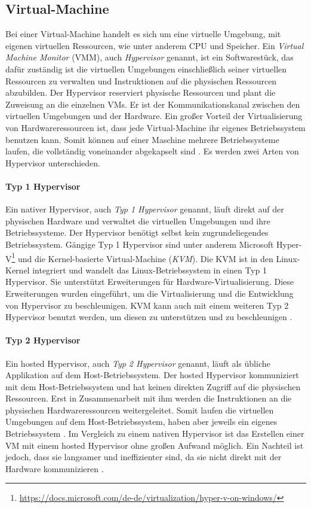 \subsection{Virtual-Machine}
Bei einer Virtual-Machine handelt es sich um eine virtuelle Umgebung, mit 
eigenen virtuellen Ressourcen, wie unter anderem CPU und Speicher.
Ein \emph{Virtual Machine Monitor} (VMM), auch \emph{Hypervisor} genannt, 
ist ein Softwarestück, das dafür zuständig ist die 
virtuellen Umgebungen einschließlich seiner virtuellen Ressourcen zu verwalten
und Instruktionen auf die physischen Ressourcen abzubilden.
Der Hypervisor reserviert physische Ressourcen und plant die Zuweisung
an die einzelnen VMs. Er ist der Kommunikationskanal 
zwischen den virtuellen Umgebungen und der Hardware.
Ein großer Vorteil der Virtualisierung von Hardwareressourcen
ist, dass jede Virtual-Machine ihr eigenes Betriebssystem
benutzen kann. Somit können auf einer Maschine
mehrere Betriebssysteme laufen, die vollständig voneinander abgekapselt sind
\cite{RedHatVM} \cite{RedHatHypervisor}. Es werden zwei
Arten von Hypervisor unterschieden.

\paragraph{Typ 1 Hypervisor} Ein nativer Hypervisor, auch
\emph{Typ 1 Hypervisor} genannt, läuft direkt auf der physischen
Hardware und verwaltet die virtuellen Umgebungen und ihre Betriebssysteme.
Der Hypervisor benötigt selbst kein zugrundeliegendes Betriebssystem.
Gängige Typ 1 Hypervisor sind unter anderem Microsoft Hyper-V\footnote{\url{https://docs.microsoft.com/de-de/virtualization/hyper-v-on-windows/}}
und die Kernel-basierte Virtual-Machine (\emph{KVM}). Die KVM \cite{RedHatKVM} ist in den Linux-Kernel integriert und wandelt
das Linux-Betriebssystem in einen Typ 1 Hypervisor. Sie unterstützt Erweiterungen für
Hardware-Virtualisierung. Diese Erweiterungen wurden eingeführt,
um die Virtualisierung und die Entwicklung von Hypervisor
zu beschleunigen. KVM kann auch mit einem weiteren
Typ 2 Hypervisor benutzt werden, um diesen zu unterstützen und
zu beschleunigen \cite{IBMHypervisor}.

\paragraph{Typ 2 Hypervisor} Ein hosted Hypervisor, auch
\emph{Typ 2 Hypervisor}  genannt, läuft als übliche
Applikation auf dem Host-Betriebssystem. Der hosted Hypervisor
kommuniziert mit dem Host-Betriebssystem und hat keinen direkten Zugriff auf die
physischen Ressourcen. Erst in Zusammenarbeit mit ihm
werden die Instruktionen an die physischen Hardwareressourcen weitergeleitet.
Somit laufen die virtuellen Umgebungen auf dem Host-Betriebssystem,
haben aber jeweils ein eigenes Betriebssystem \cite{RedHatHypervisor}.
Im Vergleich zu einem nativen Hypervisor ist das Erstellen einer VM
mit einem hosted Hypervisor ohne großen Aufwand möglich.
Ein Nachteil ist jedoch, dass sie langsamer und ineffizienter sind, da sie nicht
direkt mit der Hardware kommunizieren \cite{IBMHypervisor}.

